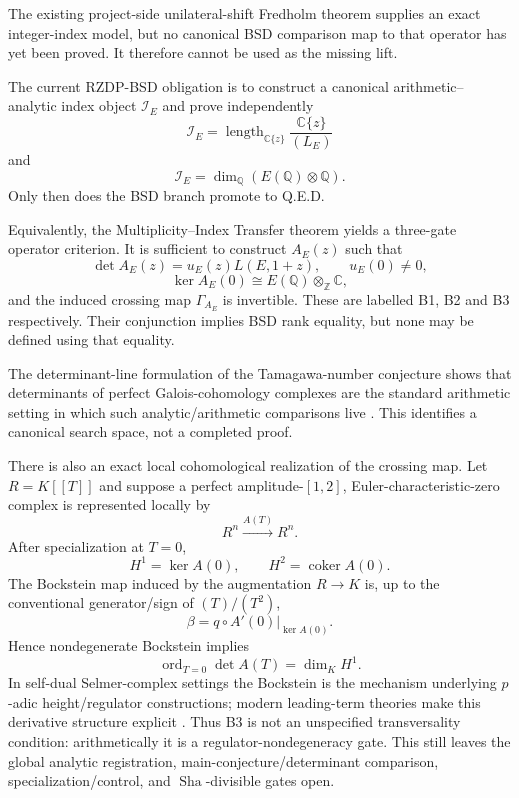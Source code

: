 \documentclass[11pt]{article}
\newcommand{\Sha}{\operatorname{Sha}}
\begin{document}
The existing project-side unilateral-shift Fredholm theorem supplies an exact integer-index model, but no canonical BSD comparison map to that operator has yet been proved. It therefore cannot be used as the missing lift.

The current RZDP-BSD obligation is to construct a canonical arithmetic--analytic index object \(\mathcal I_E\) and prove independently
\[
\mathcal I_E
=
\operatorname{length}_{\mathbb C\{z\}}
\frac{\mathbb C\{z\}}{(L_E)}
\]
and
\[
\mathcal I_E
=
\dim_{\mathbb Q}(E(\mathbb Q)\otimes\mathbb Q).
\]
Only then does the BSD branch promote to Q.E.D.

Equivalently, the Multiplicity--Index Transfer theorem yields a three-gate operator criterion. It is sufficient to construct \(A_E(z)\) such that
\[
\det A_E(z)=u_E(z)L(E,1+z),\qquad u_E(0)\ne0,
\]
\[
\ker A_E(0)\cong E(\mathbb Q)\otimes_{\mathbb Z}\mathbb C,
\]
and the induced crossing map \(\Gamma_{A_E}\) is invertible. These are labelled B1, B2 and B3 respectively. Their conjunction implies BSD rank equality, but none may be defined using that equality.

The determinant-line formulation of the Tamagawa-number conjecture shows that determinants of perfect Galois-cohomology complexes are the standard arithmetic setting in which such analytic/arithmetic comparisons live \cite{NguyenDet2015}. This identifies a canonical search space, not a completed proof.

There is also an exact local cohomological realization of the crossing map. Let \(R=K[[T]]\) and suppose a perfect amplitude-\([1,2]\), Euler-characteristic-zero complex is represented locally by
\[
R^n\xrightarrow{A(T)}R^n.
\]
After specialization at \(T=0\),
\[
H^1=\ker A(0),\qquad H^2=\operatorname{coker}A(0).
\]
The Bockstein map induced by the augmentation \(R\to K\) is, up to the conventional generator/sign of \((T)/(T^2)\),
\[
\boxed{\beta=q\circ A'(0)|_{\ker A(0)}.}
\]
Hence nondegenerate Bockstein implies
\[
\boxed{\operatorname{ord}_{T=0}\det A(T)=\dim_KH^1.}
\]
In self-dual Selmer-complex settings the Bockstein is the mechanism underlying \(p\)-adic height/regulator constructions; modern leading-term theories make this derivative structure explicit \cite{BurnsKuriharaSano2025,BenoisBuyukboduk2026}. Thus B3 is not an unspecified transversality condition: arithmetically it is a regulator-nondegeneracy gate. This still leaves the global analytic registration, main-conjecture/determinant comparison, specialization/control, and \(\Sha\)-divisible gates open.
\end{document}
